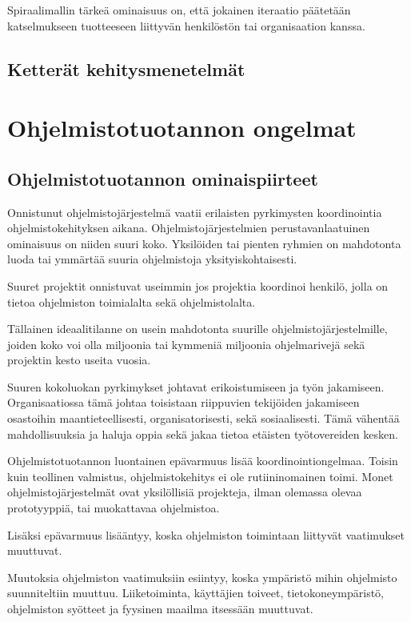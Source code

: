 \documentclass[finnish]{tktltiki2}
\theoremstyle{definition}
\theoremstyle{remark}
\begin{document}
Spiraalimallin tärkeä ominaisuus on, että jokainen iteraatio päätetään katselmukseen tuotteeseen liittyvän henkilöstön tai organisaation kanssa\cite{BOE88}.

\subsection{Ketterät kehitysmenetelmät}

\section{Ohjelmistotuotannon ongelmat}

\subsection{Ohjelmistotuotannon ominaispiirteet}

Onnistunut ohjelmistojärjestelmä vaatii erilaisten pyrkimysten koordinointia ohjelmistokehityksen aikana. Ohjelmistojärjestelmien perustavanlaatuinen ominaisuus on niiden suuri koko. Yksilöiden tai pienten ryhmien on mahdotonta luoda tai ymmärtää suuria ohjelmistoja yksityiskohtaisesti\cite{KES95}.

Suuret projektit onnistuvat useimmin jos projektia koordinoi henkilö, jolla on tietoa ohjelmiston toimialalta sekä ohjelmistolalta\cite{KES95}.

Tällainen ideaalitilanne on usein mahdotonta suurille ohjelmistojärjestelmille, joiden koko voi olla miljoonia tai kymmeniä miljoonia ohjelmarivejä sekä projektin kesto useita vuosia\cite{KES95}.

Suuren kokoluokan pyrkimykset johtavat erikoistumiseen ja työn jakamiseen. Organisaatiossa tämä johtaa toisistaan riippuvien tekijöiden jakamiseen osastoihin maantieteellisesti, organisatorisesti, sekä sosiaalisesti. Tämä vähentää mahdollisuuksia ja haluja oppia sekä jakaa tietoa etäisten työtovereiden kesken\cite{KES95}.

Ohjelmistotuotannon luontainen epävarmuus lisää koordinointiongelmaa. Toisin kuin teollinen valmistus, ohjelmistokehitys ei ole rutiininomainen toimi. Monet ohjelmistojärjestelmät ovat yksilöllisiä projekteja, ilman olemassa olevaa prototyyppiä, tai muokattavaa ohjelmistoa\cite{KES95}.


Lisäksi epävarmuus lisääntyy, koska ohjelmiston toimintaan liittyvät vaatimukset muuttuvat\cite{KES95}.

Muutoksia ohjelmiston vaatimuksiin esiintyy, koska ympäristö mihin ohjelmisto suunniteltiin muuttuu. Liiketoiminta, käyttäjien toiveet, tietokoneympäristö, ohjelmiston syötteet ja fyysinen maailma itsessään muuttuvat\cite{KES95}.
\end{document}
